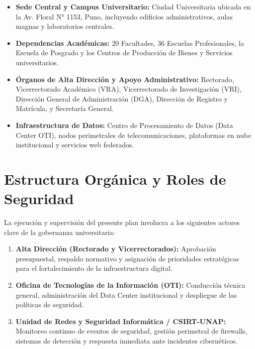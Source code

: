 \begin{itemize}[itemsep=4pt,topsep=3pt,parsep=0pt]
    \item \textbf{Sede Central y Campus Universitario:} Ciudad Universitaria ubicada en la Av. Floral N° 1153, Puno, incluyendo edificios administrativos, aulas magnas y laboratorios centrales.
    \item \textbf{Dependencias Académicas:} 20 Facultades, 36 Escuelas Profesionales, la Escuela de Posgrado y los Centros de Producción de Bienes y Servicios universitarios.
    \item \textbf{Órganos de Alta Dirección y Apoyo Administrativo:} Rectorado, Vicerrectorado Académico (VRA), Vicerrectorado de Investigación (VRI), Dirección General de Administración (DGA), Dirección de Registro y Matrícula, y Secretaría General.
    \item \textbf{Infraestructura de Datos:} Centro de Procesamiento de Datos (Data Center OTI), nodos perimetrales de telecomunicaciones, plataformas en nube institucional y servicios web federados.
\end{itemize}

\section{Estructura Orgánica y Roles de Seguridad}

La ejecución y supervisión del presente plan involucra a los siguientes actores clave de la gobernanza universitaria:

\begin{enumerate}[itemsep=4pt,topsep=3pt,parsep=0pt]
    \item \textbf{Alta Dirección (Rectorado y Vicerrectorados):} Aprobación presupuestal, respaldo normativo y asignación de prioridades estratégicas para el fortalecimiento de la infraestructura digital.
    \item \textbf{Oficina de Tecnologías de la Información (OTI):} Conducción técnica general, administración del Data Center institucional y despliegue de las políticas de seguridad.
    \item \textbf{Unidad de Redes y Seguridad Informática / CSIRT-UNAP:} Monitoreo continuo de eventos de seguridad, gestión perimetral de firewalls, sistemas de detección y respuesta inmediata ante incidentes cibernéticos.
\end{enumerate}
